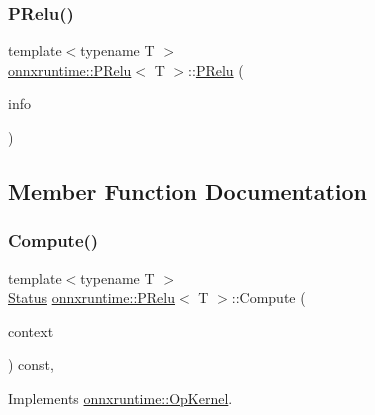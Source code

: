 \subsubsection{\texorpdfstring{P\+Relu()}{PRelu()}}
{\footnotesize\ttfamily template$<$typename T $>$ \\
\mbox{\hyperlink{classonnxruntime_1_1PRelu}{onnxruntime\+::\+P\+Relu}}$<$ T $>$\+::\mbox{\hyperlink{classonnxruntime_1_1PRelu}{P\+Relu}} (\begin{DoxyParamCaption}\item[{const \mbox{\hyperlink{classonnxruntime_1_1OpKernelInfo}{Op\+Kernel\+Info}} \&}]{info }\end{DoxyParamCaption})\hspace{0.3cm}{\ttfamily [inline]}}



\subsection{Member Function Documentation}
\mbox{\label{classonnxruntime_1_1PRelu_ad2bcecf9e193b0681308e5793c1ea5f8}} 
\subsubsection{\texorpdfstring{Compute()}{Compute()}\hspace{0.1cm}{\footnotesize\ttfamily [1/2]}}
{\footnotesize\ttfamily template$<$typename T $>$ \\
\mbox{\hyperlink{classonnxruntime_1_1common_1_1Status}{Status}} \mbox{\hyperlink{classonnxruntime_1_1PRelu}{onnxruntime\+::\+P\+Relu}}$<$ T $>$\+::Compute (\begin{DoxyParamCaption}\item[{\mbox{\hyperlink{classonnxruntime_1_1OpKernelContext}{Op\+Kernel\+Context}} $\ast$}]{context }\end{DoxyParamCaption}) const\hspace{0.3cm}{\ttfamily [override]}, {\ttfamily [virtual]}}



Implements \mbox{\hyperlink{classonnxruntime_1_1OpKernel_a9eca8656a78b1b3ab9d3351a12798650}{onnxruntime\+::\+Op\+Kernel}}.

\mbox{\label{classonnxruntime_1_1PRelu_a8dd040539db082cc21e9b01fc6cfc4d9}} 
